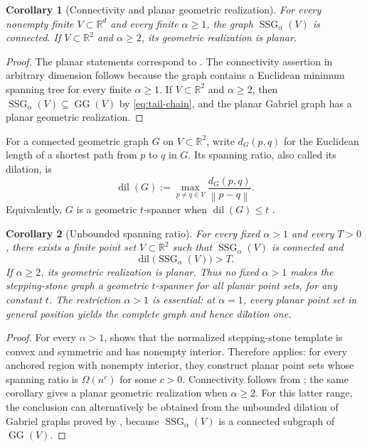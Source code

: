 \documentclass[a4paper,fleqn]{cas-sc}
\newtheorem{corollary}{Corollary}
\theoremstyle{definition}
\theoremstyle{remark}
\newcommand{\R}{\mathds{R}}
\newcommand{\norm}[1]{\left\lVert #1\right\rVert}
\newcommand{\0}{\mathbf{0}}
\newcommand{\tr}[1]{#1}
\newcommand{\tfg}[1]{#1}
\newcommand{\tr}[1]{\textcolor[HTML]{aa0000}{#1}}
\newcommand{\tfg}[1]{\textcolor[HTML]{00FF00}{#1}}
\DeclareMathOperator{\SSG}{SSG}
\DeclareMathOperator{\GG}{GG}
\begin{document}
\begin{corollary}[\tfg{Connectivity and planar geometric realization}]
\label{cor:ss-connectivity}
\tfg{For every nonempty finite $V\subset\R^d$ and every finite
$\alpha\geq1$, the graph $\SSG_\alpha(V)$ is connected. If
$V\subset\R^2$ and $\alpha\geq2$, its geometric realization is planar.}
\end{corollary}

\begin{proof}
\tfg{The planar statements correspond to
\citet[Lemmas~3.6--3.8]{kannangara2018stepping}. The
connectivity assertion in arbitrary dimension follows because the graph
contains a Euclidean minimum spanning tree for every finite
$\alpha\geq1$. If $V\subset\R^2$ and $\alpha\geq2$, then
$\SSG_\alpha(V)\subseteq\GG(V)$ by \eqref{eq:tail-chain}, and the planar
Gabriel graph has a planar geometric realization.}
\end{proof}

\tr{For a connected geometric graph $G$ on $V\subset\R^2$, write
$d_G(p,q)$ for the Euclidean length of a shortest path from $p$ to $q$ in
$G$.  Its spanning ratio, also called its dilation, is}
\begin{equation}\label{eq:dilation}
\tr{
\operatorname{dil}(G)
:=
\max_{p\ne q\in V}
\frac{d_G(p,q)}{\norm{p-q}}.
}
\end{equation}
\tr{Equivalently, $G$ is a geometric $t$-spanner when
$\operatorname{dil}(G)\leq t$
\citep{cardinal2009empty,bose2013spanners}.}

\clearpage

\begin{corollary}[\tfg{Unbounded spanning ratio}]
\label{cor:unbounded-dilation}
\tfg{For every fixed $\alpha>1$ and every $T>0$, there exists a finite
point set $V\subset\R^2$ such that $\SSG_\alpha(V)$ is connected and}
\begin{equation}
\tfg{
\operatorname{dil}\bigl(\SSG_\alpha(V)\bigr)>T.
}
\end{equation}
\tfg{If $\alpha\geq2$, its geometric realization is planar. Thus no fixed
$\alpha>1$ makes the stepping-stone graph a geometric $t$-spanner for all
planar point sets, for any constant $t$.}
\tfg{The restriction $\alpha>1$ is essential: at $\alpha=1$, every planar
point set in general position yields the complete graph and hence dilation
one.}
\end{corollary}

\begin{proof}
\tfg{For every $\alpha>1$,  shows that the normalized
stepping-stone template is convex and symmetric and has nonempty interior.
Therefore \citet[Theorem~13]{cardinal2009empty} applies: for every anchored
region with nonempty interior, they construct planar point sets whose
spanning ratio is $\Omega(n^c)$ for some $c>0$.
Connectivity follows from \Cref{cor:ss-connectivity}; the same corollary
gives a planar geometric realization when $\alpha\geq2$.
For this latter range, the conclusion can alternatively be obtained from
the unbounded dilation of Gabriel graphs proved by
\citet{eppstein2002beta}, because $\SSG_\alpha(V)$ is a connected subgraph
of $\GG(V)$.}
\end{proof}
\end{document}
